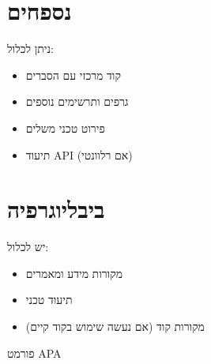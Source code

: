 \documentclass[11pt]{article}
\begin{document}
\appendix
\section{נספחים}
\begin{fillbox}
ניתן לכלול:
\begin{itemize}
  \item קוד מרכזי עם הסברים
  \item גרפים ותרשימים נוספים
  \item פירוט טכני משלים
  \item תיעוד API (אם רלוונטי)
\end{itemize}
\end{fillbox}

\section{ביבליוגרפיה}
\begin{fillbox}
יש לכלול:
\begin{itemize}
  \item מקורות מידע ומאמרים
  \item תיעוד טכני
  \item מקורות קוד (אם נעשה שימוש בקוד קיים)
\end{itemize}
פורמט APA
\end{fillbox}
\end{document}
